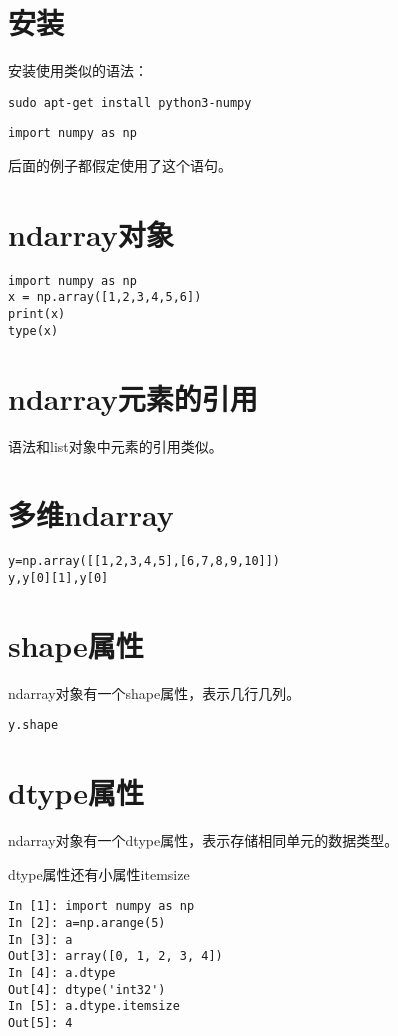 \documentclass[12pt,oneside]{book}
\begin{document}
\begin{common-format}
\mainmatter

\section{安装}
安装使用类似的语法：
\begin{Verbatim}
sudo apt-get install python3-numpy
\end{Verbatim}

\begin{Verbatim}
import numpy as np
\end{Verbatim}
后面的例子都假定使用了这个语句。


\section{ndarray对象}
\begin{Verbatim}
import numpy as np
x = np.array([1,2,3,4,5,6])
print(x)
type(x)
\end{Verbatim}


\section{ndarray元素的引用}
语法和list对象中元素的引用类似。


\section{多维ndarray}
\begin{Verbatim}
y=np.array([[1,2,3,4,5],[6,7,8,9,10]])
y,y[0][1],y[0]
\end{Verbatim}


\section{shape属性}
ndarray对象有一个shape属性，表示几行几列。
\begin{Verbatim}
y.shape
\end{Verbatim}

\section{dtype属性}
ndarray对象有一个dtype属性，表示存储相同单元的数据类型。

dtype属性还有小属性itemsize
\begin{Verbatim}
In [1]: import numpy as np
In [2]: a=np.arange(5)
In [3]: a
Out[3]: array([0, 1, 2, 3, 4])
In [4]: a.dtype
Out[4]: dtype('int32')
In [5]: a.dtype.itemsize
Out[5]: 4
\end{Verbatim}





\end{common-format}
\end{document}
